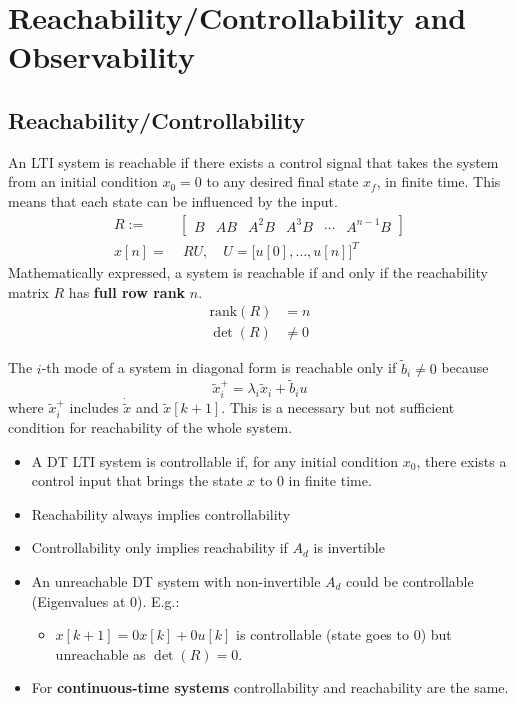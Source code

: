 \section{Reachability/Controllability and Observability}

\subsection{Reachability/Controllability}

An LTI system is reachable if there exists a control signal that takes the system from an initial condition $x_0 = 0$ to any desired final state $x_f$, in finite time. This means that each state can be influenced by the input.
\noindent\begin{align*}
    R :=   & \begin{bmatrix}
                 B & AB & A^2B & A^3B & \cdots & A^{n-1}B
             \end{bmatrix}        \\
    x[n] = & \; RU,\quad U={\bigl[u[0],\ldots, u[n]\bigr]}^T
\end{align*}
Mathematically expressed, a system is reachable if and only if the reachability matrix $R$ has \textbf{full row rank} $n$.
\begin{align*}
    \text{rank}(R) & = n     \\
    \det(R)        & \neq 0
\end{align*}


The $i$-th mode of a system in diagonal form is reachable only if $\tilde{b}_i \neq 0$ because
\begin{equation*}
    \tilde{x}_i^+ =\lambda_i\tilde{x}_i+\tilde{b}_i u
\end{equation*}
where $\tilde{x}_i^+$ includes $\dot{\tilde{x}}$ and $\tilde{x}[k+1]$. This is a necessary but not sufficient condition for reachability of the whole system.


\begin{itemize}
    \item A DT LTI system is controllable if, for any initial condition $x_0$, there exists a control input that brings the state $x$ to $0$ in finite time.
    \item Reachability always implies controllability
    \item Controllability only implies reachability if $A_d$ is invertible
    \item An unreachable DT system with non-invertible $A_d$ could be controllable (Eigenvalues at 0). E.g.:
          \begin{itemize}
              \item $x[k+1] = 0x[k] + 0u[k]$ is controllable (state goes to $0$) but unreachable as $\det(R)=0$.
          \end{itemize}
    \item For \textbf{continuous-time systems} controllability and reachability are the same.
\end{itemize}

